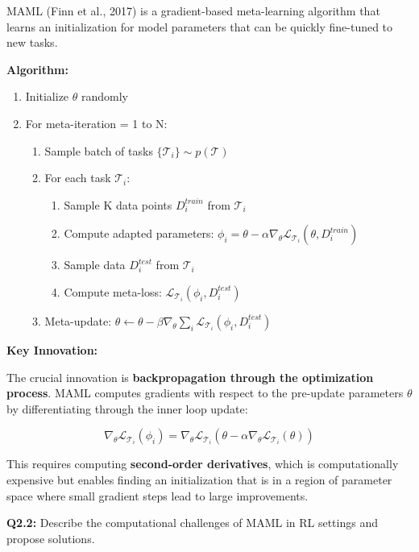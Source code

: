 \documentclass[12pt]{article}
\begin{document}
{{			MAML (Finn et al., 2017) is a gradient-based meta-learning algorithm that learns an initialization for model parameters that can be quickly fine-tuned to new tasks.
			
			\textbf{Algorithm:}
			
			\begin{enumerate}
				\item Initialize $\theta$ randomly
				\item For meta-iteration = 1 to N:
				\begin{enumerate}
					\item Sample batch of tasks $\{\mathcal{T}_i\} \sim p(\mathcal{T})$
					\item For each task $\mathcal{T}_i$:
					\begin{enumerate}
						\item Sample K data points $D_i^{train}$ from $\mathcal{T}_i$
						\item Compute adapted parameters: $\phi_i = \theta - \alpha\nabla_\theta \mathcal{L}_{\mathcal{T}_i}(\theta, D_i^{train})$
						\item Sample data $D_i^{test}$ from $\mathcal{T}_i$
						\item Compute meta-loss: $\mathcal{L}_{\mathcal{T}_i}(\phi_i, D_i^{test})$
					\end{enumerate}
					\item Meta-update: $\theta \leftarrow \theta - \beta\nabla_\theta \sum_i \mathcal{L}_{\mathcal{T}_i}(\phi_i, D_i^{test})$
				\end{enumerate}
			\end{enumerate}
			
			\textbf{Key Innovation:}
			
			The crucial innovation is \textbf{backpropagation through the optimization process}. MAML computes gradients with respect to the pre-update parameters $\theta$ by differentiating through the inner loop update:
			
			$$\nabla_\theta \mathcal{L}_{\mathcal{T}_i}(\phi_i) = \nabla_\theta \mathcal{L}_{\mathcal{T}_i}(\theta - \alpha \nabla_\theta \mathcal{L}_{\mathcal{T}_i}(\theta))$$
			
			This requires computing \textbf{second-order derivatives}, which is computationally expensive but enables finding an initialization that is in a region of parameter space where small gradient steps lead to large improvements.
			
			\textbf{Q2.2:} Describe the computational challenges of MAML in RL settings and propose solutions.
			
}}
\end{document}
